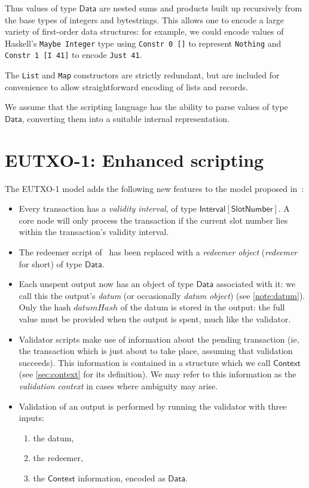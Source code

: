 \documentclass[a4paper]{article}
\newcounter{note}
\newcommand{\s}{\textsf}  %
\newcommand{\mi}[1]{\ensuremath{\mathit{#1}}}
\newcommand{\Interval}[1]{\ensuremath{\s{Interval}[#1]}}
\newcommand{\ctx}{\ensuremath{\s{Context}}}
\newcommand{\datumHash}{\mi{datumHash}}
\newcommand{\Data}{\ensuremath{\s{Data}}}
\newcommand{\slotnum}{\ensuremath{\s{SlotNumber}}}
\begin{document}
\noindent Thus values of type \Data{} are nested sums and products
built up recursively from the base types of integers and
bytestrings. This allows one to encode a large variety of first-order
data structures: for example, we could encode values of Haskell's
\verb|Maybe Integer| type using \verb|Constr 0 []| to represent
\verb|Nothing| and \verb|Constr 1 [I 41]| to encode \verb|Just 41|.


The \texttt{List} and \texttt{Map} constructors are strictly
redundant, but are included for convenience to allow straightforward
encoding of lists and records.

We assume that the scripting language has the ability to parse values
of type \Data{}, converting them into a suitable internal representation.

\section{EUTXO-1: Enhanced scripting}
\label{sec:eutxo-1}
The EUTXO-1 model adds the following new features to the model
proposed in~\citep{Zahnentferner18-UTxO}:

\begin{itemize}
\item Every transaction has a \textit{validity interval}, of type $\Interval{\slotnum}$.
  A core node will only process the transaction if
  the current slot number lies within the transaction's validity
  interval.

\item The redeemer script of~\citet{Zahnentferner18-UTxO} has been
  replaced with a \textit{redeemer object} (\textit{redeemer} for short) of
  type \Data{}.

\item Each unspent output now has an object of type \Data{} associated
  with it: we call this the output's \textit{datum} (or occasionally
  \emph{datum object}) (see \cref{note:datum}).  Only the hash
  $\datumHash$ of the datum is stored in the output: the full value
  must be provided when the output is spent, much like the validator.

\item Validator scripts make use of information about the pending
  transaction (ie, the transaction which is just about to take place,
  assuming that validation succeeds). This information is contained in
  a structure which we call \ctx{} (see \cref{sec:context} for its
  definition).  We may refer to this information as the
  \textit{validation context} in cases where ambiguity may arise.

\item Validation of an output is performed by running the validator
  with three inputs:
  \begin{enumerate}
  \item the datum,
  \item the redeemer,
  \item the \ctx{} information, encoded as \Data{}.
  \end{enumerate}

\end{itemize}
\end{document}
